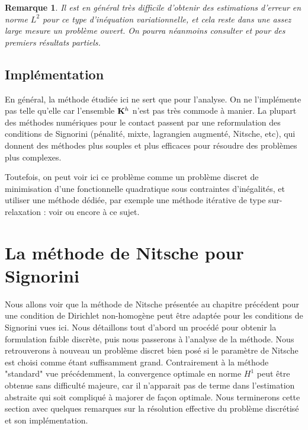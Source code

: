 \documentclass[11pt]{book}
\newtheorem{remark}[theorem]{Remarque}
\newcommand{\br}{\begin{remark}}
\newcommand{\er}{\end{remark}}
\def\K{{\bf K}}
\begin{document}
\br
Il est en général très difficile d'obtenir des estimations d'erreur en norme $L^2$ pour ce type d'inéquation variationnelle, et cela reste dans une assez large mesure un problème ouvert. %
On pourra néanmoins consulter \cite{coorevits-hild-lhalouani-sassi-02} et \cite{steinbach-2016} pour des premiers résultats partiels. %
\er

\subsection{Implémentation}

En général, la méthode étudiée ici ne sert que pour l'analyse. On ne l'implémente pas telle qu'elle car l'ensemble $\K^h$ n'est pas très commode à manier. La plupart des méthodes numériques pour le contact passent par une reformulation des conditions de Signorini (pénalité, mixte, lagrangien augmenté, Nitsche, etc), qui donnent des méthodes plus souples et plus efficaces pour résoudre des problèmes plus complexes.

\medskip

Toutefois, on peut voir ici ce problème comme un problème discret de minimisation d'une fonctionnelle quadratique sous contraintes d'inégalités, et utiliser une méthode dédiée, par exemple une méthode itérative de type sur-relaxation : voir \cite[Section 4.6.1]{glowinski-84} ou encore \cite[Chapter 6]{kikuchi-oden-88} à ce sujet.

\section{La méthode de Nitsche pour Signorini}

Nous allons voir que la méthode de Nitsche présentée au chapitre précédent pour une condition de Dirichlet non-homogène peut être adaptée pour les conditions de Signorini vues ici. Nous détaillons tout d'abord un procédé pour obtenir la formulation faible discrète, puis nous passerons à l'analyse de la méthode. Nous retrouverons à nouveau un problème discret bien posé si le paramètre de Nitsche est choisi comme étant suffisamment grand. Contrairement à la méthode "standard" vue précédemment, la convergence optimale en norme $H^1$ peut être obtenue sans difficulté majeure, car il n'apparait pas de terme dans l'estimation abstraite qui soit compliqué à majorer de façon optimale. Nous terminerons cette section avec quelques remarques sur la résolution effective du problème discrétisé et son implémentation.
\end{document}
